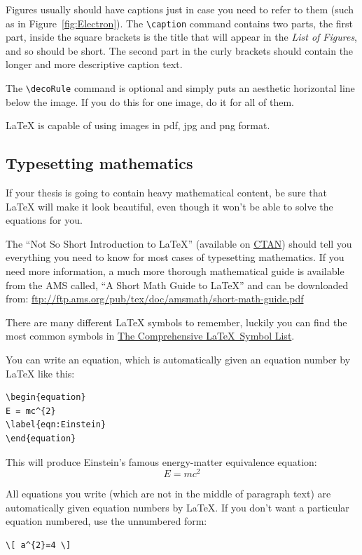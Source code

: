 Figures usually should have captions just in case you need to refer to them (such as in Figure~\ref{fig:Electron}). The \verb|\caption| command contains two parts, the first part, inside the square brackets is the title that will appear in the \emph{List of Figures}, and so should be short. The second part in the curly brackets should contain the longer and more descriptive caption text.

The \verb|\decoRule| command is optional and simply puts an aesthetic horizontal line below the image. If you do this for one image, do it for all of them.

\LaTeX{} is capable of using images in pdf, jpg and png format.

\subsection{Typesetting mathematics}

If your thesis is going to contain heavy mathematical content, be sure that \LaTeX{} will make it look beautiful, even though it won't be able to solve the equations for you.

The \enquote{Not So Short Introduction to \LaTeX} (available on \href{http://www.ctan.org/tex-archive/info/lshort/english/lshort.pdf}{CTAN}) should tell you everything you need to know for most cases of typesetting mathematics. If you need more information, a much more thorough mathematical guide is available from the AMS called, \enquote{A Short Math Guide to \LaTeX} and can be downloaded from:
\url{ftp://ftp.ams.org/pub/tex/doc/amsmath/short-math-guide.pdf}

There are many different \LaTeX{} symbols to remember, luckily you can find the most common symbols in \href{http://ctan.org/pkg/comprehensive}{The Comprehensive \LaTeX~Symbol List}.

You can write an equation, which is automatically given an equation number by \LaTeX{} like this:
\begin{verbatim}
\begin{equation}
E = mc^{2}
\label{eqn:Einstein}
\end{equation}
\end{verbatim}

This will produce Einstein's famous energy-matter equivalence equation:
\begin{equation}
E = mc^{2}
\label{eqn:Einstein}
\end{equation}

All equations you write (which are not in the middle of paragraph text) are automatically given equation numbers by \LaTeX{}. If you don't want a particular equation numbered, use the unnumbered form:
\begin{verbatim}
\[ a^{2}=4 \]
\end{verbatim}

